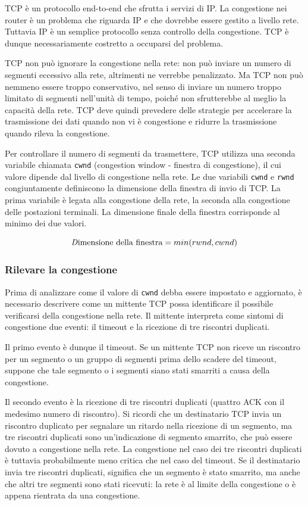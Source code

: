 TCP è un protocollo end-to-end che sfrutta i servizi di IP. La congestione nei router è un problema che riguarda IP e che dovrebbe essere gestito a livello rete. Tuttavia IP è un semplice protocollo senza controllo della congestione. TCP è dunque necessariamente costretto a occuparsi del problema.

TCP non può ignorare la congestione nella rete: non può inviare un numero di segmenti eccessivo alla rete, altrimenti ne verrebbe penalizzato. Ma TCP non può nemmeno essere troppo conservativo, nel senso di inviare un numero troppo limitato di segmenti nell'unità di tempo, poiché non sfrutterebbe al meglio la capacità della rete. TCP deve quindi prevedere delle strategie per accelerare la trasmissione dei dati quando non vi è congestione e ridurre la trasmissione quando rileva la congestione.

Per controllare il numero di segmenti da trasmettere, TCP utilizza una seconda variabile chiamata \verb|cwnd| (congestion window - finestra di congestione), il cui valore dipende dal livello di congestione nella rete. Le due variabili \verb|cwnd| e \verb|rwnd| congiuntamente definiscono la dimensione della finestra di invio di TCP. La prima variabile è legata alla congestione della rete, la seconda alla congestione delle postazioni terminali. La dimensione finale della finestra corrisponde al minimo dei due valori.

\begin{equation*}
    \text{\textit Dimensione della finestra} = min(rwnd, cwnd)    
\end{equation*}

\subsubsection{Rilevare la congestione}
Prima di analizzare come il valore di \verb|cwnd| debba essere impostato e aggiornato, è necessario descrivere come un mittente TCP possa identificare il possibile verificarsi della congestione nella rete. Il mittente interpreta come sintomi di congestione due eventi: il timeout e la ricezione di tre riscontri duplicati.

Il primo evento è dunque il timeout. Se un mittente TCP non riceve un riscontro per un segmento o un gruppo di segmenti prima dello scadere del timeout, suppone che tale segmento o i segmenti siano stati smarriti a causa della congestione.

Il secondo evento è la ricezione di tre riscontri duplicati (quattro ACK con il medesimo numero di riscontro). Si ricordi che un destinatario TCP invia un riscontro duplicato per segnalare un ritardo nella ricezione di un segmento, ma tre riscontri duplicati sono un'indicazione di segmento smarrito, che può essere dovuto a congestione nella rete. La congestione nel caso dei tre riscontri duplicati è tuttavia probabilmente meno critica che nel caso del timeout. Se il destinatario invia tre riscontri duplicati, significa che un segmento è stato smarrito, ma anche che altri tre segmenti sono stati ricevuti: la rete è al limite della congestione o è appena rientrata da una congestione.

